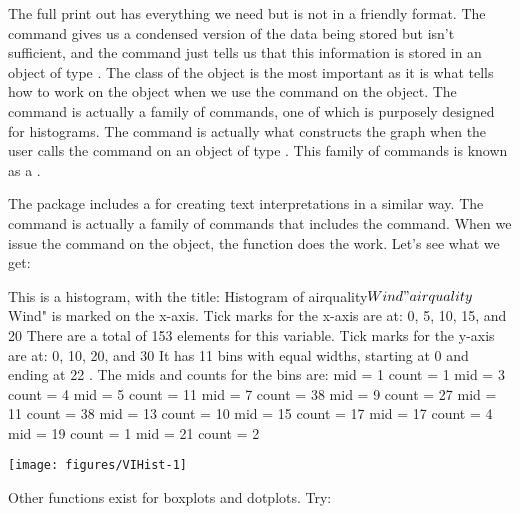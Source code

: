  
The full print out has everything we need but is not in a friendly format. The  command gives us a condensed version of the data being stored but isn't sufficient, and the  command just tells us that this information is stored in an object of type . The class of the object is the most important as it is what tells \R{} how to work on the object when we use the  command on the  object. The  command is actually a family of commands, one of which is purposely designed for histograms. The  command is actually what constructs the graph when the user calls the  command on an object of type . This family of commands is known as a . 
 
The  package includes a  for creating text interpretations in a similar way. The  command is actually a family of commands that includes the  command. When we issue the  command on the  object, the  function does the work. Let's see what we get: 

\begin{Schunk}
\begin{Soutput}
This is a histogram, with the title: Histogram of airquality$Wind
"airquality$Wind" is marked on the x-axis.
Tick marks for the x-axis are at: 0, 5, 10, 15, and 20 
There are a total of 153 elements for this variable.
Tick marks for the y-axis are at: 0, 10, 20, and 30 
It has 11 bins with equal widths, starting at 0 and ending at 22 .
The mids and counts for the bins are:
mid = 1  count = 1 
mid = 3  count = 4 
mid = 5  count = 11 
mid = 7  count = 38 
mid = 9  count = 27 
mid = 11  count = 38 
mid = 13  count = 10 
mid = 15  count = 17 
mid = 17  count = 4 
mid = 19  count = 1 
mid = 21  count = 2
\end{Soutput}
\end{Schunk}
\texttt{[image: figures/VIHist-1]} 


 
 
Other functions exist for boxplots and dotplots. Try: 

